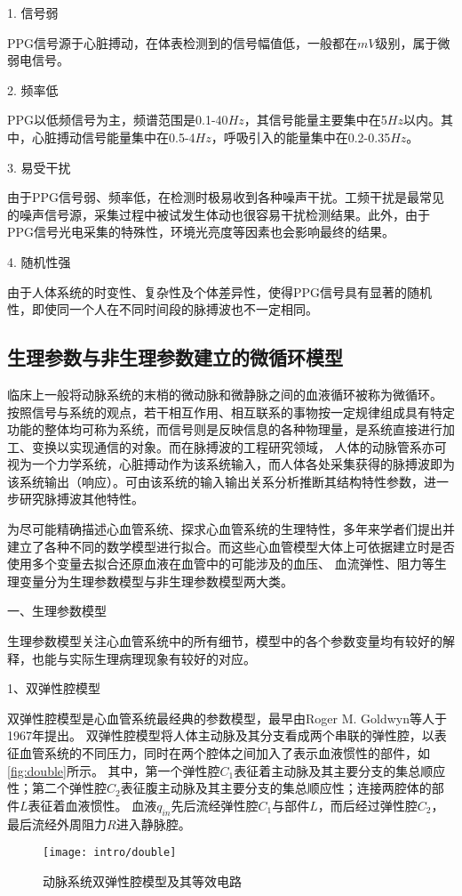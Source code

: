 1. 信号弱

PPG信号源于心脏搏动，在体表检测到的信号幅值低，一般都在$mV$级别，属于微弱电信号。

2. 频率低

PPG以低频信号为主，频谱范围是0.1-40$Hz$，其信号能量主要集中在5$Hz$以内。其中，心脏搏动信号能量集中在0.5-4$Hz$，呼吸引入的能量集中在0.2-0.35$Hz$。

3. 易受干扰

由于PPG信号弱、频率低，在检测时极易收到各种噪声干扰。工频干扰是最常见的噪声信号源，采集过程中被试发生体动也很容易干扰检测结果。此外，由于PPG信号光电采集的特殊性，环境光亮度等因素也会影响最终的结果。

4. 随机性强

由于人体系统的时变性、复杂性及个体差异性，使得PPG信号具有显著的随机性，即使同一个人在不同时间段的脉搏波也不一定相同。

\subsection{生理参数与非生理参数建立的微循环模型}
临床上一般将动脉系统的末梢的微动脉和微静脉之间的血液循环被称为微循环\cite{Abraham2011,John2004}。
按照信号与系统的观点，若干相互作用、相互联系的事物按一定规律组成具有特定功能的整体均可称为系统，而信号则是反映信息的各种物理量，是系统直接进行加工、变换以实现通信的对象\cite{Alan2019}。而在脉搏波的工程研究领域，
人体的动脉管系亦可视为一个力学系统，心脏搏动作为该系统输入，而人体各处采集获得的脉搏波即为该系统输出（响应）。可由该系统的输入输出关系分析推断其结构特性参数，进一步研究脉搏波其他特性\cite{PPGYY}。

为尽可能精确描述心血管系统、探求心血管系统的生理特性，多年来学者们提出并建立了各种不同的数学模型进行拟合。而这些心血管模型大体上可依据建立时是否使用多个变量去拟合还原血液在血管中的可能涉及的血压、
血流弹性、阻力等生理变量分为生理参数模型与非生理参数模型两大类。

一、生理参数模型

生理参数模型关注心血管系统中的所有细节，模型中的各个参数变量均有较好的解释，也能与实际生理病理现象有较好的对应。

1、双弹性腔模型

双弹性腔模型是心血管系统最经典的参数模型，最早由Roger M. Goldwyn等人\cite{Goldwyn1967}于1967年提出。
双弹性腔模型将人体主动脉及其分支看成两个串联的弹性腔，以表征血管系统的不同压力，同时在两个腔体之间加入了表示血液惯性的部件，如\autoref{fig:double}所示。
其中，第一个弹性腔$C_{1}$表征着主动脉及其主要分支的集总顺应性；第二个弹性腔$C_{2}$表征腹主动脉及其主要分支的集总顺应性；连接两腔体的部件$L$表征着血液惯性。
血液$q_{in}$先后流经弹性腔$C_{1}$与部件$L$，而后经过弹性腔$C_{2}$，最后流经外周阻力$R$进入静脉腔。
\begin{figure}[htbp]
    \centering
    \texttt{[image: intro/double]}
    \caption[动脉系统双弹性腔模型及其等效电路]{\label{fig:double}动脉系统双弹性腔模型及其等效电路\cite{PPGYY}}
\end{figure}


